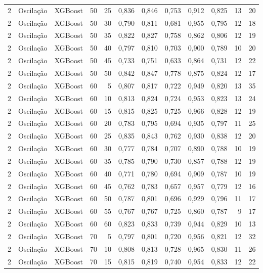 \begin{longtable}{@{}rllrrrrrrrrr@{}}
2 & Oscilação & XGBoost & 50 & 25 & 0,836 & 0,846 & 0,753 & 0,912 & 0,825 & 13 & 20 \\
2 & Oscilação & XGBoost & 50 & 30 & 0,790 & 0,811 & 0,681 & 0,955 & 0,795 & 12 & 18 \\
2 & Oscilação & XGBoost & 50 & 35 & 0,822 & 0,827 & 0,758 & 0,862 & 0,806 & 12 & 19 \\
2 & Oscilação & XGBoost & 50 & 40 & 0,797 & 0,810 & 0,703 & 0,900 & 0,789 & 10 & 20 \\
2 & Oscilação & XGBoost & 50 & 45 & 0,733 & 0,751 & 0,633 & 0,864 & 0,731 & 12 & 22 \\
2 & Oscilação & XGBoost & 50 & 50 & 0,842 & 0,847 & 0,778 & 0,875 & 0,824 & 12 & 17 \\
2 & Oscilação & XGBoost & 60 & 5 & 0,807 & 0,817 & 0,722 & 0,949 & 0,820 & 13 & 35 \\
2 & Oscilação & XGBoost & 60 & 10 & 0,813 & 0,824 & 0,724 & 0,953 & 0,823 & 13 & 24 \\
2 & Oscilação & XGBoost & 60 & 15 & 0,815 & 0,825 & 0,725 & 0,966 & 0,828 & 12 & 19 \\
2 & Oscilação & XGBoost & 60 & 20 & 0,783 & 0,795 & 0,694 & 0,935 & 0,797 & 11 & 25 \\
2 & Oscilação & XGBoost & 60 & 25 & 0,835 & 0,843 & 0,762 & 0,930 & 0,838 & 12 & 20 \\
2 & Oscilação & XGBoost & 60 & 30 & 0,777 & 0,784 & 0,707 & 0,890 & 0,788 & 10 & 19 \\
2 & Oscilação & XGBoost & 60 & 35 & 0,785 & 0,790 & 0,730 & 0,857 & 0,788 & 12 & 19 \\
2 & Oscilação & XGBoost & 60 & 40 & 0,771 & 0,780 & 0,694 & 0,909 & 0,787 & 10 & 19 \\
2 & Oscilação & XGBoost & 60 & 45 & 0,762 & 0,783 & 0,657 & 0,957 & 0,779 & 12 & 16 \\
2 & Oscilação & XGBoost & 60 & 50 & 0,787 & 0,801 & 0,696 & 0,929 & 0,796 & 11 & 17 \\
2 & Oscilação & XGBoost & 60 & 55 & 0,767 & 0,767 & 0,725 & 0,860 & 0,787 & 9 & 17 \\
2 & Oscilação & XGBoost & 60 & 60 & 0,823 & 0,833 & 0,739 & 0,944 & 0,829 & 10 & 13 \\
2 & Oscilação & XGBoost & 70 & 5 & 0,797 & 0,801 & 0,720 & 0,956 & 0,821 & 12 & 32 \\
2 & Oscilação & XGBoost & 70 & 10 & 0,808 & 0,813 & 0,728 & 0,965 & 0,830 & 11 & 26 \\
2 & Oscilação & XGBoost & 70 & 15 & 0,815 & 0,819 & 0,740 & 0,954 & 0,833 & 12 & 22 \\

\end{longtable}
